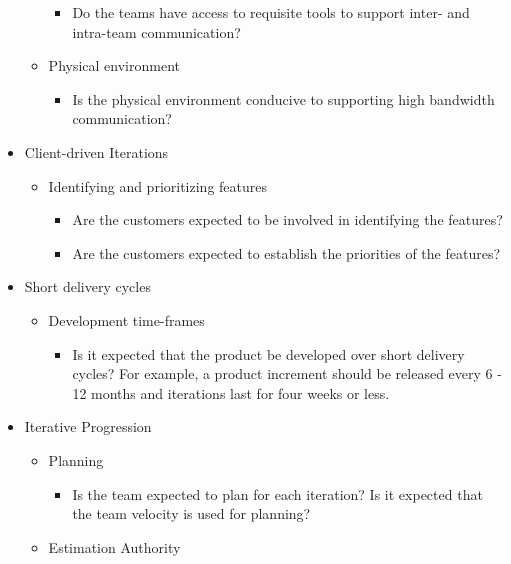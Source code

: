 \begin{appendices}
\begin{itemize}
\begin{itemize}
\begin{itemize}
					\item Do the teams have access to requisite tools to support inter- and intra-team communication?
				\end{itemize}
			\item Physical environment
				\begin{itemize}
					\item Is the physical environment conducive to supporting high bandwidth communication?
				\end{itemize}
		\end{itemize}
	\item Client-driven Iterations
		\begin{itemize}
			\item Identifying and prioritizing features
				\begin{itemize}
					\item Are the customers expected to be involved in identifying the features?
					\item Are the customers expected to establish the priorities of the features?
				\end{itemize}
		\end{itemize}
	\item Short delivery cycles
		\begin{itemize}
			\item Development time-frames
				\begin{itemize}
					\item Is it expected that the product be developed over short delivery cycles? For example, a product increment should be released every 6 - 12 months and iterations last for four weeks or less.
				\end{itemize}
		\end{itemize}
	\item Iterative Progression
		\begin{itemize}
			\item Planning
				\begin{itemize}
					\item Is the team expected to plan for each iteration?
					\addition Is it expected that the team velocity is used for planning?
				\end{itemize}
			\item Estimation Authority

\end{itemize}
\end{itemize}
\end{appendices}
